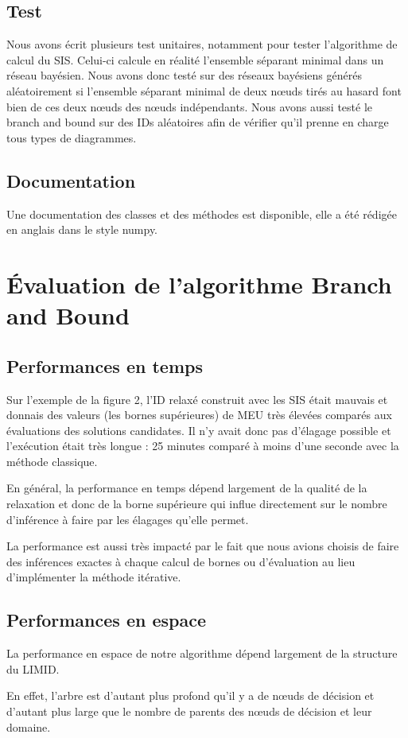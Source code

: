 \documentclass[12pt]{article}
\begin{document}
\subsection{Test}
Nous avons écrit plusieurs test unitaires, notamment pour tester l'algorithme de calcul du SIS. Celui-ci calcule en réalité l'ensemble séparant minimal dans un réseau bayésien. Nous avons donc testé sur des réseaux bayésiens générés aléatoirement si l'ensemble séparant minimal de deux nœuds tirés au hasard font bien de ces deux nœuds des nœuds indépendants. Nous avons aussi testé le branch and bound sur des IDs aléatoires afin de vérifier qu'il prenne en charge tous types de diagrammes.

\subsection{Documentation}
Une documentation des classes et des méthodes est disponible, elle a été rédigée en anglais dans le style numpy.
\section{Évaluation de l'algorithme Branch and Bound}
\subsection{Performances en temps}
Sur l'exemple de la figure 2, l'ID relaxé construit avec les SIS était mauvais et donnais des valeurs (les bornes supérieures) de MEU très élevées comparés aux évaluations des solutions candidates. Il n'y avait donc pas d'élagage possible et l'exécution était très longue : 25 minutes comparé à moins d'une seconde avec la méthode classique.

En général, la performance en temps dépend largement de la qualité de la relaxation et donc de la borne supérieure qui influe directement sur le nombre d'inférence à faire par les élagages qu'elle permet.

La performance est aussi très impacté par le fait que nous avions choisis de faire des inférences exactes à chaque calcul de bornes ou d'évaluation au lieu d'implémenter la méthode itérative.
\subsection{Performances en espace}
La performance en espace de notre algorithme dépend largement de la structure du LIMID. 

En effet, l'arbre est d'autant plus profond qu'il y a de nœuds de décision et d'autant plus large que le nombre de parents des nœuds de décision et leur domaine. 
\end{document}
